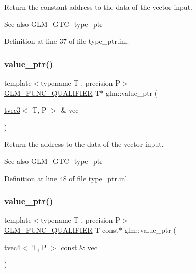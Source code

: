 Return the constant address to the data of the vector input. \begin{DoxySeeAlso}{See also}
\mbox{\hyperlink{group__gtc__type__ptr}{G\+L\+M\+\_\+\+G\+T\+C\+\_\+type\+\_\+ptr}} 
\end{DoxySeeAlso}


Definition at line 37 of file type\+\_\+ptr.\+inl.

\mbox{\label{group__gtc__type__ptr_gab2832ef9f1d2571fab5c7ae661e11e75}} 
\subsubsection{\texorpdfstring{value\_ptr()}{value\_ptr()}\hspace{0.1cm}{\footnotesize\ttfamily [4/27]}}
{\footnotesize\ttfamily template$<$typename T , precision P$>$ \\
\mbox{\hyperlink{setup_8hpp_a33fdea6f91c5f834105f7415e2a64407}{G\+L\+M\+\_\+\+F\+U\+N\+C\+\_\+\+Q\+U\+A\+L\+I\+F\+I\+ER}} T$\ast$ glm\+::value\+\_\+ptr (\begin{DoxyParamCaption}\item[{\mbox{\hyperlink{structglm_1_1tvec3}{tvec3}}$<$ T, P $>$ \&}]{vec }\end{DoxyParamCaption})}

Return the address to the data of the vector input. \begin{DoxySeeAlso}{See also}
\mbox{\hyperlink{group__gtc__type__ptr}{G\+L\+M\+\_\+\+G\+T\+C\+\_\+type\+\_\+ptr}} 
\end{DoxySeeAlso}


Definition at line 48 of file type\+\_\+ptr.\+inl.

\mbox{\label{group__gtc__type__ptr_gaf641bc0e28d4b274826b9afed315d310}} 
\subsubsection{\texorpdfstring{value\_ptr()}{value\_ptr()}\hspace{0.1cm}{\footnotesize\ttfamily [5/27]}}
{\footnotesize\ttfamily template$<$typename T , precision P$>$ \\
\mbox{\hyperlink{setup_8hpp_a33fdea6f91c5f834105f7415e2a64407}{G\+L\+M\+\_\+\+F\+U\+N\+C\+\_\+\+Q\+U\+A\+L\+I\+F\+I\+ER}} T const$\ast$ glm\+::value\+\_\+ptr (\begin{DoxyParamCaption}\item[{\mbox{\hyperlink{structglm_1_1tvec4}{tvec4}}$<$ T, P $>$ const \&}]{vec }\end{DoxyParamCaption})}

